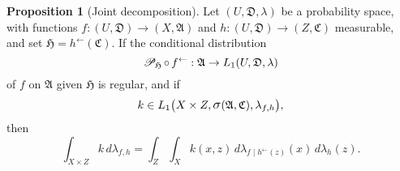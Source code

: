 \documentclass[
twoside=true,
paper=letter,
fontsize=11pt,
pagesize=auto,
leqno,
openany,
headsepline,
overfullrule,
]{scrbook}
\theoremstyle{plain}
\theoremstyle{plain}
\theoremstyle{definition}
\theoremstyle{bfnoteitalic}
\newtheorem{propboldnote}[thm]{Proposition}
\theoremstyle{bfnoteroman}
\newcommand{\sigalg}[1]{\mathfrak{#1}}
\newcommand{\cali}[1]{\mathscr{#1}}
\newcommand{\condprobop}[1]{\mathop{\cali{P}\hspace{-1pt}}\nolimits_{#1}}
\newcommand{\sagb}{\mathop{\hbox{\large{$\sigma$}}}\nolimits}
\newcommand{\preimage}[1]{#1^{\leftarrow}}
\newcommand{\sigmaalgebra}{\sigalg{A}}
\newcommand{\sigmaalgebraiii}{\sigalg{C}}
\newcommand{\productsig}[2]{\sagb(#1,#2)}
\newcommand{\function}{f}
\newcommand{\functioniii}{h}
\newcommand{\functioniv}{k}
\newcommand{\measurespace}{X}
\newcommand{\measurespaceiii}{Z}
\newcommand{\mspaceelt}{x}
\newcommand{\mspaceeltiii}{z}
\newcommand{\measureiii}{\lambda}
\newcommand{\uspace}{U}%
\newcommand{\uspacesig}{\sigalg{D}}
\begin{document}
\begin{propboldnote}[Joint decomposition]\label{joint_decomposition}
Let 
$(\uspace, \uspacesig, \measureiii)$ 
be a probability space, with functions
$\function:(\uspace,\uspacesig)\to (\measurespace,\sigmaalgebra)$ 
and
$\functioniii:(\uspace,\uspacesig)\to (\measurespaceiii,\sigmaalgebraiii)$
measurable, and set 
$\sigalg{H} = \preimage{\functioniii}(\sigmaalgebraiii)$. 
If the conditional distribution 
\[
\condprobop{\sigalg{H}}\circ\, \preimage{\function}:
\sigmaalgebra \to L_1(\uspace,\uspacesig,\measureiii)
\]
of $\function$ on $\sigmaalgebra$ given $\sigalg{H}$ 
is regular, and if
\[
\functioniv\in
L_1\bigl(\measurespace\times\measurespaceiii,
\productsig{\sigmaalgebra}{\sigmaalgebraiii},
\measureiii_{\function,\functioniii}\bigr),
\]
then 
\[
\int_{\measurespace\times\measurespaceiii} \functioniv\,
d \measureiii_{\function,\functioniii}
=
\int_\measurespaceiii\int_\measurespace
\functioniv(\mspaceelt,\mspaceeltiii) \,
d \measureiii_{\function\mid\preimage{\functioniii}(\mspaceeltiii)}(\mspaceelt)\,
d \measureiii_{\functioniii}(\mspaceeltiii).
\]
\end{propboldnote}
\end{document}

